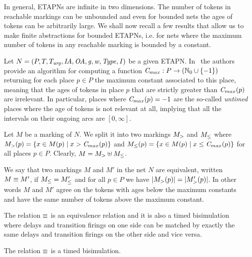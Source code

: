 
In general, ETAPNs are infinite in two dimensions. The number of tokens
in reachable markings can be unbounded and even for bounded nets
the ages of tokens can be arbitrarily large. We shall now recall a 
few results that allow us to make finite abstractions for bounded
ETAPNs, i.e. for nets where the maximum number of tokens in any
reachable marking is bounded by a constant.

Let $N=(P, T, T_{\mathit{urg}}, \mathit{IA},\allowbreak \mathit{OA}, \mathit{g}, \mathit{w}, \mathit{Type}, \mathit{I})$ be a given ETAPN.
In~\cite{ALSST:MEMICS:12} 
the authors provide an algorithm for computing 
a function $\mathit{C}_{max}: P \rightarrow (\mathbb{N}_{0} \cup \{ -1 \})$ 
returning for each place $p \in P$ the maximum constant associated
to this place, meaning that the ages of tokens in place $p$ that
are strictly greater than $\mathit{C}_{max}(p)$ are irrelevant. In particular,
places where $\mathit{C}_{max}(p)=-1$ are the so-called \emph{untimed} places
where the age of tokens is not relevant at all, implying that all
the intervals on their ongoing arcs are $[0,\infty]$.

Let $M$ be a marking of $N$. We split it into 
two markings $M_{>}$ and $M_{\leq}$ where 
$M_{>} (p)=\left\{ x\in M(p) \mid x>\mathit{C}_{max}(p) \right\}$ 
and $M_{\leq} (p)=\allowbreak\left\{ x\in M(p) \mid 
x\allowbreak\leq\allowbreak \mathit{C}_{max}(p) \right\}$
for all places $p \in P$. Clearly,
$M = M_{>} \uplus M_{\leq}$.

We say that two markings $M$ and $M'$ in the net $N$ are equivalent, 
written $M \equiv M^{\prime}$, 
if $M_{\leq}=M_{\leq}^{\prime}$
and for all $p \in P$ we have
$|M_{>} (p)|=|M_{>}^{\prime}(p)|$.
In other words $M$ and $M'$ agree on the tokens with ages below the
maximum constants and have the same number of tokens above the maximum
constant.

The relation $\equiv$ is an equivalence relation and it is
also a timed bisimulation 
where delays and transition firings on one side can be matched by
exactly the same delays and transition firings on the other side
and vice versa. %

\begin{theorem}
\label{thm:bisim}
  The relation $\equiv$ is a timed bisimulation.
\end{theorem}

